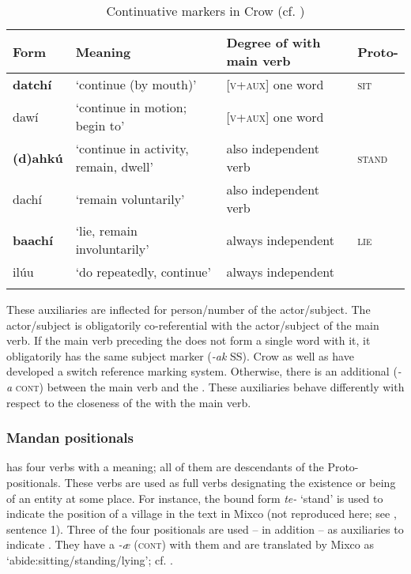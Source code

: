 \documentclass[output=paper]{langsci/langscibook}
\begin{document}
\begin{table}
\begin{tabularx}{\textwidth}{lQQl}
\lsptoprule
Form & Meaning & Degree of  with main verb & Proto-\\
\midrule
\textbf{{datchí}} & `continue (by mouth)' & \textsc{[v+aux]} one word & \scshape sit\\
{dawí} & `continue in motion; begin to' & \textsc{[v+aux]} one word & \\
\textbf{(d)ahkú} & `continue in activity, remain, dwell' & also independent verb & \scshape stand\\
{dachí} & `remain voluntarily' & also independent verb & \\
\textbf{{baachí}} & `lie, remain involuntarily' & always independent & \scshape lie\\
{ilúu} & `do repeatedly, continue' & always independent & \\
\lspbottomrule
\end{tabularx}
\caption{Continuative markers in Crow (cf. \citealt[305--309]{Graczyk2007})}
\label{tab:helmbrecht:6}
\end{table}

These auxiliaries are inflected for person/number of the actor/subject. The actor/subject is obligatorily co-referential with the actor\slash subject of the main verb. If the main verb preceding the  does not form a single word with it, it obligatorily has the same subject marker (\textit{-ak} SS). Crow as well as  have developed a switch reference marking system. Otherwise, there is an additional  (\textit{-a} \textsc{cont}) between the main verb and the . These auxiliaries behave differently with respect to the closeness of the  with the main verb.

\subsubsection{Mandan positionals}\label{sec:helmbrecht:2.2.2}

 has four  verbs with a  meaning; all of them are descendants of the Proto- positionals. These  verbs are used as full verbs designating the existence or being of an entity at some place. For instance, the bound form \textit{te-} `stand' is used to indicate the position of a village in the text in Mixco (not reproduced here; see \citealt[66]{Mixco1997}, sentence 1). 
Three of the four positionals are used – in addition – as auxiliaries to indicate . They have a  \textit{-æ} (\textsc{cont}) with them and are translated by Mixco as `abide:sitting\slash standing\slash lying'; cf. .
\end{document}
